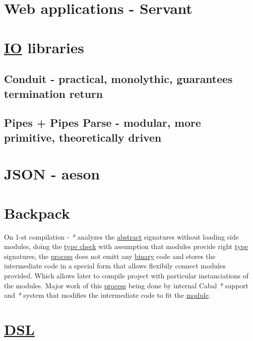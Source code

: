 \documentclass[a4paper,14pt,oneside]{book}
\begin{document}
\chapter{Web applications - Servant}
\label{sec:orge5f1836}

\chapter{\hyperref[org12ccf19]{IO} libraries}
\label{sec:org6082c19}

\section{Conduit - practical, monolythic, guarantees termination return}
\label{sec:org34cdc70}

\section{Pipes + Pipes Parse - modular, more primitive, theoretically driven}
\label{sec:org819a31d}

\chapter{JSON - aeson}
\label{sec:org27b2275}

\chapter{\label{org80cc09c}Backpack}
\label{sec:org159cf9f}
On 1-st compilation - \emph{*} analyzes the \hyperref[orgb7bd289]{abstract} signatures without loading side modules, doing the \hyperref[org35a5c40]{type check} with assumption that modules provide right \hyperref[org99e5c3b]{type} signatures, the \hyperref[org7aaca48]{process} does not emitt any \hyperref[orgadebdb8]{binary} code and stores the intermediate code in a special form that allows flexibily connect modules provided. Which allows later to compile project with particular instanciations of the modules. Major work of this \hyperref[org7aaca48]{process} being done by internal Cabal \emph{*} support and \emph{*} system that modifies the intermediate code to fit the \hyperref[orgfad88dd]{module}.

\chapter{\hyperref[org0e4ca50]{DSL}}
\label{sec:org03a87d6}
\end{document}
